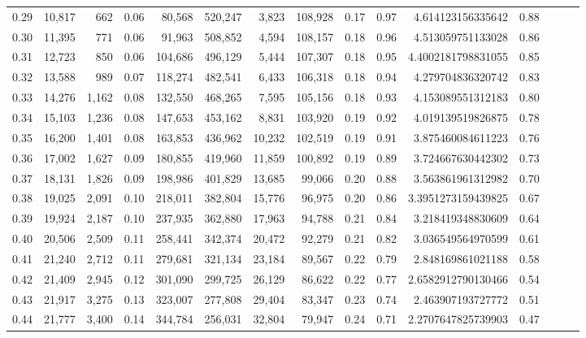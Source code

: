 \begin{tabular}{rrrrrrrrrrrrrrr}
0.29 &  10,817 &    662 &  0.06 &   80,568 &  520,247 &    3,823 &  108,928 &  0.17 &  0.97 &       4.614123156335642 &      0.88 \\
0.30 &  11,395 &    771 &  0.06 &   91,963 &  508,852 &    4,594 &  108,157 &  0.18 &  0.96 &       4.513059751133028 &      0.86 \\
0.31 &  12,723 &    850 &  0.06 &  104,686 &  496,129 &    5,444 &  107,307 &  0.18 &  0.95 &      4.4002181798831055 &      0.85 \\
0.32 &  13,588 &    989 &  0.07 &  118,274 &  482,541 &    6,433 &  106,318 &  0.18 &  0.94 &       4.279704836320742 &      0.83 \\
0.33 &  14,276 &  1,162 &  0.08 &  132,550 &  468,265 &    7,595 &  105,156 &  0.18 &  0.93 &       4.153089551312183 &      0.80 \\
0.34 &  15,103 &  1,236 &  0.08 &  147,653 &  453,162 &    8,831 &  103,920 &  0.19 &  0.92 &       4.019139519826875 &      0.78 \\
0.35 &  16,200 &  1,401 &  0.08 &  163,853 &  436,962 &   10,232 &  102,519 &  0.19 &  0.91 &       3.875460084611223 &      0.76 \\
0.36 &  17,002 &  1,627 &  0.09 &  180,855 &  419,960 &   11,859 &  100,892 &  0.19 &  0.89 &       3.724667630442302 &      0.73 \\
0.37 &  18,131 &  1,826 &  0.09 &  198,986 &  401,829 &   13,685 &   99,066 &  0.20 &  0.88 &       3.563861961312982 &      0.70 \\
0.38 &  19,025 &  2,091 &  0.10 &  218,011 &  382,804 &   15,776 &   96,975 &  0.20 &  0.86 &      3.3951273159439825 &      0.67 \\
0.39 &  19,924 &  2,187 &  0.10 &  237,935 &  362,880 &   17,963 &   94,788 &  0.21 &  0.84 &       3.218419348830609 &      0.64 \\
0.40 &  20,506 &  2,509 &  0.11 &  258,441 &  342,374 &   20,472 &   92,279 &  0.21 &  0.82 &       3.036549564970599 &      0.61 \\
0.41 &  21,240 &  2,712 &  0.11 &  279,681 &  321,134 &   23,184 &   89,567 &  0.22 &  0.79 &       2.848169861021188 &      0.58 \\
0.42 &  21,409 &  2,945 &  0.12 &  301,090 &  299,725 &   26,129 &   86,622 &  0.22 &  0.77 &      2.6582912790130466 &      0.54 \\
0.43 &  21,917 &  3,275 &  0.13 &  323,007 &  277,808 &   29,404 &   83,347 &  0.23 &  0.74 &       2.463907193727772 &      0.51 \\
0.44 &  21,777 &  3,400 &  0.14 &  344,784 &  256,031 &   32,804 &   79,947 &  0.24 &  0.71 &      2.2707647825739903 &      0.47 \\

\end{tabular}
